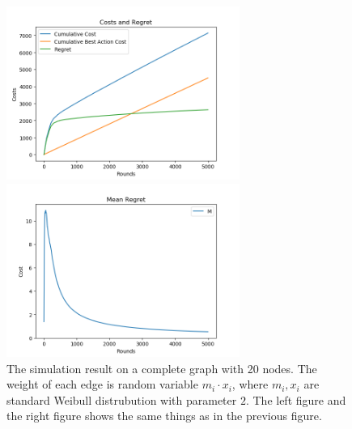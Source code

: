 \documentclass{article}
\theoremstyle{plain}
\theoremstyle{definition}
\theoremstyle{remark}
\begin{document}
    \begin{figure}[htbp!]
        \begin{minipage}[h]{0.5\linewidth}
            \centering
            \includegraphics[width=3in]{simple-cost-regret-weibull2.png}
        \end{minipage}
        \begin{minipage}[h]{0.5\linewidth}
            \centering
            \includegraphics[width=3in]{simple-mean-regret-weibull2.png}
        \end{minipage}
        \caption{The simulation result on a complete graph with 20 nodes. The weight of each edge is random variable $m_i \cdot x_i$, where $m_i,x_i$ are standard Weibull distrubution with parameter $2$. The left figure and the right figure shows the same things as in the previous figure.}
        \label{center-weibull2}
    \end{figure}
\end{document}
